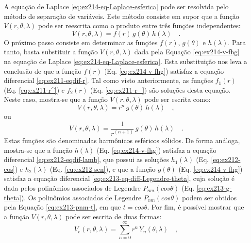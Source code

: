 \documentclass[10pt,a4paper,fleqn]{article}
\begin{document}
A equação de Laplace \ref{eq:ex214-eq-Laplace-esferica} pode ser resolvida pelo m\'{e}todo de separaç\~{a}o de vari\'{a}veis. 
Este m\'{e}todo consiste em supor que a funç\~{a}o $V(r,\theta,\lambda)$ pode ser reescrita como o produto entre tr\^{e}s funç\~{o}es 
independentes:
\begin{equation}
V(r,\theta,\lambda) = f(r) \, g(\theta) \, h(\lambda) \quad .
\label{eq:ex214-v-fhg}
\end{equation}
O pr\'{o}ximo passo consiste em determinar as funç\~{o}es $f(r)$, $g(\theta)$ e $h(\lambda)$. Para tanto, basta substituir a funç\~{a}o 
$V(r,\theta,\lambda)$ dada pela Equaç\~{a}o \ref{eq:ex214-v-fhg} na equaç\~{a}o de Laplace \ref{eq:ex214-eq-Laplace-esferica}. Esta 
substituiç\~{a}o nos leva a conclus\~{a}o de que a funç\~{a}o $f(r)$ (Eq. \ref{eq:ex214-v-fhg}) satisfaz a equaç\~{a}o diferencial 
\ref{eq:ex211-eqdif-r}. Tal como visto anteriormente, as funç\~{o}es $f_{1}(r)$ (Eq. \ref{eq:ex211-r^}) e $f_{2}(r)$ 
(Eq. \ref{eq:ex211-r_}) s\~{a}o soluç\~{o}es desta equaç\~{a}o. Neste caso, mostra-se que a funç\~{a}o $V(r,\theta,\lambda)$ pode 
ser escrita como:
\begin{equation}
V(r,\theta,\lambda) = r^{n} \, g(\theta) \, h(\lambda) \quad ,
\label{eq:ex214-v-f1gh}
\end{equation}
ou
\begin{equation}
V(r,\theta,\lambda) = \frac{1}{r^{(n+1)}} \, g(\theta) \, h(\lambda) \quad .
\label{eq:ex214-v-f2gh}
\end{equation}
Estas funç\~{o}es s\~{a}o denominadas harm\^{o}nicos esf\'{e}ricos s\'{o}lidos. De forma an\'{a}loga, mostra-se que a funç\~{a}o 
$h(\lambda)$ (Eq. \ref{eq:ex214-v-fhg}) satisfaz a equaç\~{a}o diferencial \ref{eq:ex212-eqdif-lamb}, que possui as soluç\~{o}es 
$h_{1}(\lambda)$ (Eq. \ref{eq:ex212-cos}) e $h_{2}(\lambda)$ (Eq. \ref{eq:ex212-sen}), e que a funç\~{a}o $g(\theta)$ (Eq. 
\ref{eq:ex214-v-fhg}) satisfaz a equaç\~{a}o diferencial \ref{eq:ex213-eq-diff-Legendre-theta}, cuja soluç\~{a}o \'{e} dada 
pelos polin\^{o}mios associados de Legendre $P_{nm}(cos\theta)$ (Eq. \ref{eq:ex213-g-theta}). Os polin\^{o}mios associados de 
Legendre $P_{nm}(cos\theta)$ podem ser obtidos pela Equação \ref{eq:ex213-pnm-t}, em que $t = cos \theta$. Por fim, \'{e} poss\'{i}vel 
mostrar que a funç\~{a}o $V(r,\theta,\lambda)$ pode ser escrita de duas formas:
\begin{equation}
V_{e}(r,\theta,\lambda) = \sum_{n=0}^{\infty} r^{n} \, 
Y_{n}(\theta, \lambda) \quad ,
\label{eq:ex214-ve}
\end{equation}
\end{document}
